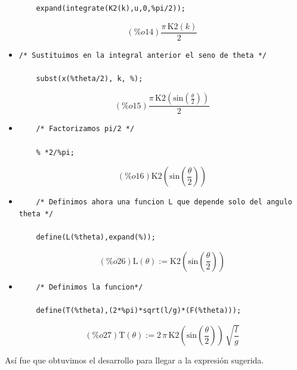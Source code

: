 \documentclass[12pt]{article}
\begin{document}
\begin{itemize}
\begin{verbatim}
	expand(integrate(K2(k),u,0,%pi/2));
	\end{verbatim}
	\[(\%o14) \frac{\pi \,\mathrm{K2}\left( k\right) }{2}\]
	\item \begin{verbatim}/* Sustituimos en la integral anterior el seno de theta */
	
	subst(x(%theta/2), k, %);
	\end{verbatim}
	\[(\%o15) \frac{\pi \,\mathrm{K2}\left( \mathrm{sin}\left( \frac{\theta}{2}\right) \right) }{2}\]
	\item \begin{verbatim}
	/* Factorizamos pi/2 */
	
	% *2/%pi;
	\end{verbatim}
	\[(\%o16) \mathrm{K2}\left( \mathrm{sin}\left( \frac{\theta}{2}\right) \right) \]
	\item \begin{verbatim}
	/* Definimos ahora una funcion L que depende solo del angulo theta */
	
	define(L(%theta),expand(%));
	\end{verbatim}
	\[(\%o26) \mathrm{L}\left( \theta\right) :=\mathrm{K2}\left( \mathrm{sin}\left( \frac{\theta}{2}\right) \right) \]
	
	\item \begin{verbatim}
	/* Definimos la funcion*/
	
	define(T(%theta),(2*%pi)*sqrt(l/g)*(F(%theta)));
	\end{verbatim}
	\[(\%o27) \mathrm{T}\left( \theta\right) :=2\,\pi \,\mathrm{K2}\left( \mathrm{sin}\left( \frac{\theta}{2}\right) \right) \,\sqrt{\frac{l}{g}}\]
\end{itemize}
Así fue que obtuvimos el desarrollo para llegar a la expresión sugerida.
\end{document}
